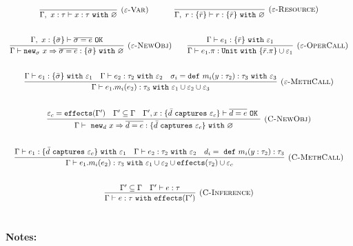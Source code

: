 \documentclass{llncs}
\newcommand{\keywadj}[1]{\mathtt{#1}}
\newcommand{\keyw}[1]{\keywadj{#1}~}
\newcommand{\type}[2]{
	#1~\keyw{with} #2
}
\newcommand{\newsig}[0]{
	\keywadj{new}_\sigma~x \Rightarrow \overline{\sigma = e}
}
\begin{document}
\noindent
\fbox{$\Gamma \vdash e : \tau~\keyw{with} \varepsilon$}

\[
\begin{array}{c}
	\infer[\textsc{($\varepsilon$-Var)}]
  {\Gamma,~x:\tau \vdash x: \type{\tau}{\varnothing} }
  {} 
~~~~~~~~~~
\infer[\textsc{($\varepsilon$-Resource)}]
  {\Gamma,~r :\{\bar r\} \vdash r: \type{   \{ \bar r \}  }{\varnothing}}
  {} \\[5ex]

\infer[\textsc{($\varepsilon$-NewObj)}]
	{\Gamma \vdash \newsig : \{ \bar \sigma \}~\keyw{with} \varnothing}
	{\Gamma,~x : \{ \bar \sigma \} \vdash \overline{\sigma = e}~\keywadj{OK}} ~~~~~~

\infer[\textsc{($\varepsilon$-OperCall)}]
	{\Gamma \vdash e_1.\pi : \keyw{Unit} \keyw{with} \{ \bar r.\pi \} \cup \varepsilon_1}
	{\Gamma \vdash e_1 : \{ \bar r \}~ \keyw{with} \varepsilon_1} \\[5ex]
	
\infer[\textsc{($\varepsilon$-MethCall)}]
	{\Gamma \vdash e_1.m_i(e_2):\tau_3~\keyw{with} \varepsilon_1 \cup \varepsilon_2 \cup \varepsilon_3}
	{\Gamma \vdash e_1 : \{ \bar \sigma \}~\keyw{with} \varepsilon_1 & \Gamma \vdash e_2 : \tau_2~\keyw{with} \varepsilon_2 & \sigma_i = \keyw{def} m_i(y:\tau_2):\tau_3~\keyw{with} \varepsilon_3} \\[5ex]
	
\infer[\textsc{(C-NewObj)}]
	{\Gamma \vdash~\keywadj{new}_d~x \Rightarrow \overline{d = e} : \{  \bar d~\keyw{captures} \varepsilon_c \} ~\keyw{with} \varnothing }
	{\varepsilon_c = \keywadj{effects}(\Gamma') & \Gamma' \subseteq \Gamma & \Gamma', x : \{ \bar d~\keyw {captures} \varepsilon_c \} \vdash \overline{d = e}~\keyw{OK}} \\[5ex]
	
\infer[\textsc{(C-MethCall)}]
	{\Gamma \vdash e_1.m_i(e_2) : \tau_3~ \keyw{with} \varepsilon_1 \cup \varepsilon_2 \cup \keywadj{effects}(\tau_2) \cup \varepsilon_c}
	{\Gamma \vdash e_1 : \{ \bar d~\keyw{captures} \varepsilon_c \}~\keyw{with} \varepsilon_1 & \Gamma \vdash e_2:\tau_2~\keyw{with} \varepsilon_2&d_i =~\keyw{def} m_i(y:\tau_2):\tau_3 } \\[5ex]

\infer[\textsc{(C-Inference)}]
	{\Gamma \vdash e : \tau ~\keyw{with} \keywadj{effects}(\Gamma') }
	{\Gamma' \subseteq \Gamma & \Gamma' \vdash e : \tau } \\[5ex]
\end{array}
\]

\noindent \textbf{Notes:}
\end{document}
